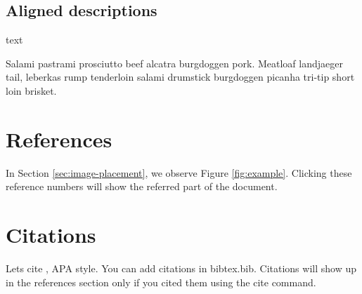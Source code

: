 \documentclass[12pt]{article}
\begin{document}
\subsection{Aligned descriptions}
\begin{description}[leftmargin=!,labelwidth=\widthof{\bfseries Not very meaty}] 
  \item[Not very meaty] text
  \item[Meaty] Salami pastrami prosciutto beef alcatra burgdoggen pork. Meatloaf landjaeger tail, leberkas rump tenderloin salami drumstick burgdoggen picanha tri-tip short loin brisket.
\end{description}

\section{References}
In Section \ref{sec:image-placement}, we observe Figure \ref{fig:example}. Clicking these reference numbers will show the referred part of the document.

\section{Citations}
Lets cite \cite{einstein}, APA style. You can add citations in bibtex.bib. Citations will show up in the references section only if you cited them using the cite command.

\printbibliography
\end{document}
